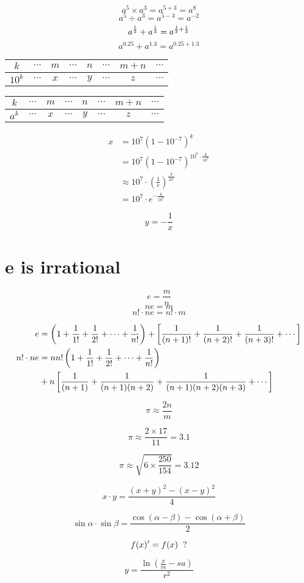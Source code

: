 $$  a^5 \times a^3 = a^{5+3} = a^8  $$   
$$   a^5  \div a^3 = a^{5-3} = a^{-2} $$
$$ a^{1\over2} + a^{1\over 3} = a^{\frac 1 2 + \frac 1 3} $$
$$  a^{0.25}  +  a^{1.3}  =   a^{0.25 + 1.3}  $$

\begin{tabular}{c|ccccccc}
\hline
$k$  & $\cdots$ & $m$ & $\cdots$ & $n$ & $\cdots$ & $m+n$ & $\cdots$ \\
\hline
$10^k$  & $\cdots$ &  $x$  & $\cdots$ & $y$ & $\cdots$ & $z$ & $\cdots$ \\
\hline
\end{tabular}


\begin{tabular}{c|ccccccc}
\hline
$k$  & $\cdots$ & $m$ & $\cdots$ & $n$ & $\cdots$ & $m+n$ & $\cdots$ \\
\hline
$a^k$  & $\cdots$ &  $x$  & $\cdots$ & $y$ & $\cdots$ & $z$ & $\cdots$ \\
\hline
\end{tabular}

\begin{align*}
 x & = 10^7(1- 10^{-7})^k   \\
   &=  10^7(1- 10^{-7})^{10^7 \cdot \frac k {10^7} } \\
   & \approx  10^7 \cdot  \left(\frac{1}{e}\right)^\frac{k}{10^7}  \\
   &  = \displaystyle 10^7 \cdot  e^{-\frac{k}{10^7} }
\end{align*}


$$ y = - \frac{1}{x} $$

\section{ e is irrational }


$$ e = \frac m n $$
$$ ne =  m $$ 
$$ n! \cdot ne = n! \cdot m $$
 
 \begin{align*}
 e & =  \left( 1 + {1 \over 1!} + {1\over 2!} + \cdots + {1 \over n!}   \right)   +  \left[ {1 \over (n+1)! }  + {1 \over (n+2)!}  +  {1 \over (n+3)! } + \cdots  \right] \\
 n! \cdot ne & =   n n! \left( 1 + {1 \over 1!} + {1\over 2!}  + \cdots + {1 \over n!}   \right)  \\
 &   + n\left[ {1 \over (n+1)}  + {1 \over (n+1)(n+2)}  + {1 \over (n+1)(n+2)(n+3)} + \cdots \right]
 \end {align*}
 
 
 $$ \pi \approx  \frac{2n}{m}  $$
 
 $$  \pi \approx   \frac {2 \times 17}{11} = 3.1 $$  
 
 $$ \pi \approx  \sqrt {6 \times \frac{250}{154}}  =  3.12  $$
 
$$ x \cdot y = \frac{(x+y)^2 - (x-y)^2}{4} $$

$$ \sin \alpha \cdot \sin \beta = \frac{ \cos(\alpha-\beta) - \cos(\alpha + \beta)}{2} $$ 

$$  f(x)' = f(x)    \hspace{0.2cm} ?$$

$$ y = \frac{\ln (\frac{x}{m} - sa)}{r^2} $$

